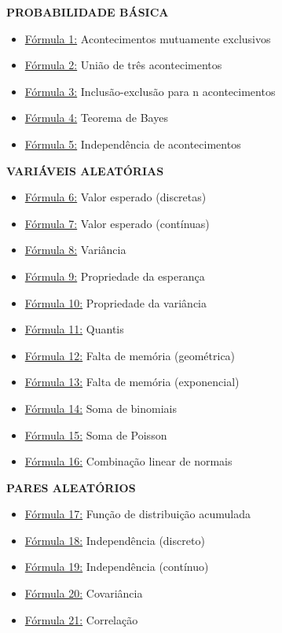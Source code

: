 \documentclass[a4paper,12pt]{article}
\begin{document}
\begin{multicols}{2}
\small
\textbf{\color{sectioncolor}PROBABILIDADE BÁSICA}
\begin{itemize}[leftmargin=*]
    \item \hyperref[formula1]{\color{formulalink}Fórmula 1:} Acontecimentos mutuamente exclusivos
    \item \hyperref[formula2]{\color{formulalink}Fórmula 2:} União de três acontecimentos
    \item \hyperref[formula3]{\color{formulalink}Fórmula 3:} Inclusão-exclusão para n acontecimentos
    \item \hyperref[formula4]{\color{formulalink}Fórmula 4:} Teorema de Bayes
    \item \hyperref[formula5]{\color{formulalink}Fórmula 5:} Independência de acontecimentos
\end{itemize}

\textbf{\color{sectioncolor}VARIÁVEIS ALEATÓRIAS}
\begin{itemize}[leftmargin=*]
    \item \hyperref[formula6]{\color{formulalink}Fórmula 6:} Valor esperado (discretas)
    \item \hyperref[formula7]{\color{formulalink}Fórmula 7:} Valor esperado (contínuas)
    \item \hyperref[formula8]{\color{formulalink}Fórmula 8:} Variância
    \item \hyperref[formula9]{\color{formulalink}Fórmula 9:} Propriedade da esperança
    \item \hyperref[formula10]{\color{formulalink}Fórmula 10:} Propriedade da variância
    \item \hyperref[formula11]{\color{formulalink}Fórmula 11:} Quantis
    \item \hyperref[formula12]{\color{formulalink}Fórmula 12:} Falta de memória (geométrica)
    \item \hyperref[formula13]{\color{formulalink}Fórmula 13:} Falta de memória (exponencial)
    \item \hyperref[formula14]{\color{formulalink}Fórmula 14:} Soma de binomiais
    \item \hyperref[formula15]{\color{formulalink}Fórmula 15:} Soma de Poisson
    \item \hyperref[formula16]{\color{formulalink}Fórmula 16:} Combinação linear de normais
\end{itemize}

\textbf{\color{sectioncolor}PARES ALEATÓRIOS}
\begin{itemize}[leftmargin=*]
    \item \hyperref[formula17]{\color{formulalink}Fórmula 17:} Função de distribuição acumulada
    \item \hyperref[formula18]{\color{formulalink}Fórmula 18:} Independência (discreto)
    \item \hyperref[formula19]{\color{formulalink}Fórmula 19:} Independência (contínuo)
    \item \hyperref[formula20]{\color{formulalink}Fórmula 20:} Covariância
    \item \hyperref[formula21]{\color{formulalink}Fórmula 21:} Correlação
\end{itemize}


\end{multicols}
\end{document}
